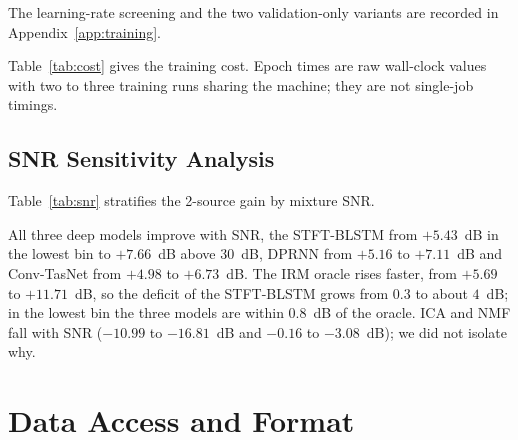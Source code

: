 \documentclass[journal]{IEEEtran}
\begin{document}
The learning-rate screening and the two validation-only variants are recorded in Appendix~\ref{app:training}.

Table~\ref{tab:cost} gives the training cost. Epoch times are raw wall-clock values with two to three training runs sharing the machine; they are not
single-job timings.

\begin{table}[t]
\centering
\caption{Training cost per epoch (minimum / median / maximum over the epochs of the final runs; two-source: seeds 1 and 2,
otherwise seed 0) and the number of other final training runs at the same time.
The maximum of the 2-source Conv-TasNet includes two manual pauses of one run.
Scoring jobs, screens and the seed-0 pilots are not counted. STFT-BLSTM ran on the
CPU, the others on the GPU of an Apple M4 Pro with 48~GB memory.}
\label{tab:cost}
\resizebox{\columnwidth}{!}{%
}
\end{table}

\subsection{SNR Sensitivity Analysis}
\label{sec:snr}

Table~\ref{tab:snr} stratifies the 2-source gain by mixture SNR.

\begin{table}[t]
\centering
\caption{Two-source gain over the input (dB) by mixture SNR on the test split.}
\label{tab:snr}
\resizebox{\columnwidth}{!}{%
}
\end{table}

All three deep models improve with SNR, the STFT-BLSTM from $+5.43$~dB in the lowest bin to $+7.66$~dB above 30~dB, DPRNN from $+5.16$ to $+7.11$~dB and
Conv-TasNet from $+4.98$ to $+6.73$~dB. The IRM oracle rises faster, from $+5.69$ to $+11.71$~dB, so the deficit of the STFT-BLSTM grows from $0.3$ to
about $4$~dB; in the lowest bin the three models are within $0.8$~dB of the oracle. ICA and NMF fall with SNR ($-10.99$ to $-16.81$~dB and $-0.16$ to $-3.08$~dB); we did not
isolate why.

\section{Data Access and Format}
\label{sec:access}
\end{document}
